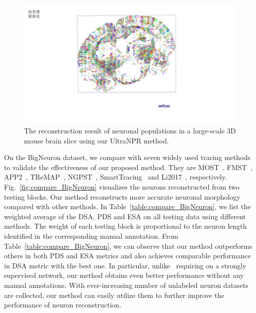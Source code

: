 \begin{figure}[t]
	\centering
	\includegraphics[width=1\columnwidth]{./Illustrations/brain_slice.pdf}
	\caption{The reconstruction result of neuronal populations in a large-scale 3D mouse brain slice using our UltraNPR method.}
	\label{fig:reconstruct_brain}
\end{figure}


On the BigNeuron dataset, we compare with seven widely used tracing methods to validate the effectiveness of our proposed method.
They are MOST~\cite{Wu2014}, FMST~\cite{Yang2018}, APP2~\cite{Xiao2013}, TReMAP~\cite{Zhou2016}, NGPST~\cite{Quan2015}, SmartTracing~\cite{Chen2015} and Li2017~\cite{Li2017}, respectively.
Fig.~\ref{fig:compare_BigNeuron} visualizes the neurons reconstructed from two testing blocks.
Our method reconstructs more accurate neuronal morphology compared with other methods.
In Table~\ref{table:compare_BigNeuron}, we list the weighted average of the DSA, PDS and ESA on all testing data using different methods.
The weight of each testing block is proportional to the neuron length identified in the corresponding manual annotation.
From Table~\ref{table:compare_BigNeuron}, we can observe that our method outperforms others in both PDS and ESA metrics and also achieves comparable performance in DSA metric with the best one.
In particular, unlike~\cite{Li2017} requiring on a strongly supervised network, our method obtains even better performance without any manual annotations.
With ever-increasing number of unlabeled neuron datasets are collected, our method can easily utilize them to further improve the performance of neuron reconstruction.

